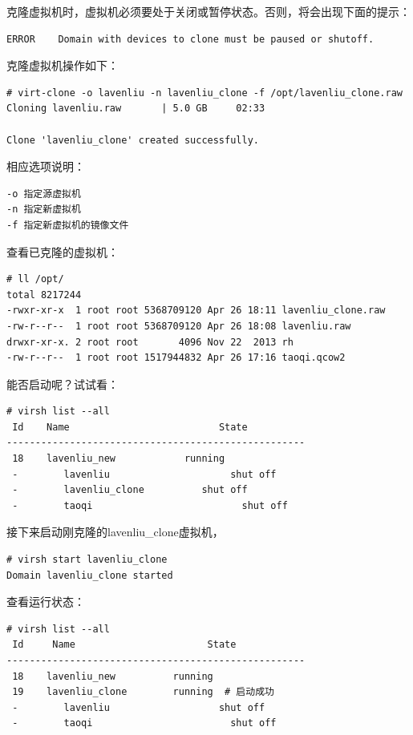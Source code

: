 克隆虚拟机时，虚拟机必须要处于关闭或暂停状态。否则，将会出现下面的提示：

\begin{verbatim}
ERROR    Domain with devices to clone must be paused or shutoff.
\end{verbatim}

克隆虚拟机操作如下：

\begin{verbatim}
# virt-clone -o lavenliu -n lavenliu_clone -f /opt/lavenliu_clone.raw
Cloning lavenliu.raw       | 5.0 GB     02:33     

Clone 'lavenliu_clone' created successfully.
\end{verbatim}

相应选项说明：

\begin{verbatim}
-o 指定源虚拟机
-n 指定新虚拟机
-f 指定新虚拟机的镜像文件
\end{verbatim}

查看已克隆的虚拟机：

\begin{verbatim}
# ll /opt/
total 8217244
-rwxr-xr-x  1 root root 5368709120 Apr 26 18:11 lavenliu_clone.raw
-rw-r--r--  1 root root 5368709120 Apr 26 18:08 lavenliu.raw
drwxr-xr-x. 2 root root       4096 Nov 22  2013 rh
-rw-r--r--  1 root root 1517944832 Apr 26 17:16 taoqi.qcow2
\end{verbatim}

能否启动呢？试试看：

\begin{verbatim}
# virsh list --all
 Id    Name                          State
----------------------------------------------------
 18    lavenliu_new            running
 -        lavenliu                     shut off
 -        lavenliu_clone          shut off
 -        taoqi                          shut off
\end{verbatim}

接下来启动刚克隆的lavenliu\_clone虚拟机，

\begin{verbatim}
# virsh start lavenliu_clone
Domain lavenliu_clone started
\end{verbatim}

查看运行状态：

\begin{verbatim}
# virsh list --all
 Id     Name                       State
----------------------------------------------------
 18    lavenliu_new          running
 19    lavenliu_clone        running  # 启动成功
 -        lavenliu                   shut off
 -        taoqi                        shut off
\end{verbatim}



